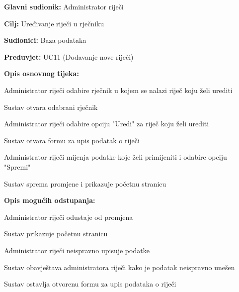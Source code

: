 					\noindent {}
				\begin{packed_item}
					
					\item \textbf{Glavni sudionik: }Administrator riječi
					\item  \textbf{Cilj:} Uređivanje riječi u rječniku
					\item  \textbf{Sudionici:} Baza podataka
					\item  \textbf{Preduvjet:} UC11 (Dodavanje nove riječi)
					\item  \textbf{Opis osnovnog tijeka:}
					
					\item[] \begin{packed_enum}
						
						\item Administrator riječi odabire rječnik u kojem se nalazi riječ koju želi urediti
						\item Sustav otvara odabrani rječnik
						\item Administrator riječi odabire opciju "Uredi" za riječ koju želi urediti
						\item Sustav otvara formu za upis podatak o riječi
						\item Administrator riječi mijenja podatke koje želi primijeniti i odabire opciju "Spremi"
						\item Sustav sprema promjene i prikazuje početnu stranicu
					\end{packed_enum}
					
					\item  \textbf{Opis mogućih odstupanja:}
					
					\item[] \begin{packed_item}
						
						\item[5.a] Administrator riječi odustaje od promjena
						\item[] \begin{packed_enum}
							
							\item Sustav prikazuje početnu stranicu
							
						\end{packed_enum}
						
						\item[5.b] Administrator riječi neispravno upisuje podatke
						\item[] \begin{packed_enum}
							
							\item Sustav obavještava administratora riječi kako je podatak neispravno unešen
							\item Sustav ostavlja otvorenu formu za upis podataka o riječi
							
						\end{packed_enum}
						
					\end{packed_item}
				\end{packed_item}
				
